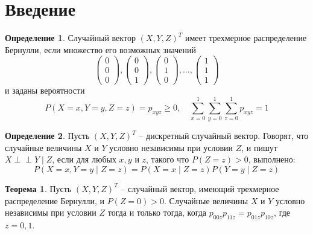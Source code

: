 \documentclass[a4paper,14pt]{extarticle}
\theoremstyle{definition}
\newtheorem{definition}{Определение}[section]
\newtheorem{theorem}{Теорема}[section]
\def\ci{\perp\!\!\!\perp}
\begin{document}
\section{Введение}

\begin{definition}
    Случайный вектор $(X,Y,Z)^T$ имеет трехмерное распределение Бернулли,
    если множество его возможных значений
    $$
        \begin{pmatrix}
            0 \\
            0 \\
            0
        \end{pmatrix},
        \begin{pmatrix}
            0 \\
            0 \\
            1
        \end{pmatrix},
        \begin{pmatrix}
            0 \\
            1 \\
            0
        \end{pmatrix}, \ldots, \begin{pmatrix}
            1 \\
            1 \\
            1
        \end{pmatrix}
    $$ и заданы вероятности
    $$P(X=x,Y=y,Z=z)=p_{xyz} \geq 0, \quad \sum_{x=0}^{1}\sum_{y=0}^{1}\sum_{z=0}^{1}p_{xyz}=1$$
\end{definition}

\begin{definition}
    Пусть $(X,Y,Z)^T$ -- дискретный случайный вектор.
    Говорят, что случайные величины $X$ и $Y$ условно независимы при условии $Z$,
    и пишут $X \ci Y \mid Z$, если
    для любых $x,y$ и $z$, такого что $P(Z=z)>0$, выполнено:
    $$
        P(X=x, Y=y \mid Z = z) = P(X=x \mid Z = z) P(Y=y \mid Z = z)
    $$
\end{definition}

\begin{theorem}\label{thm1}
    Пусть $(X,Y,Z)^T$ -- случайный вектор, имеющий трехмерное распределение Бернулли, и $P(Z=0)>0$.
    Случайные величины $X$ и $Y$ условно независимы при условии $Z$ тогда и только тогда, когда
    $p_{00z}p_{11z}=p_{01z}p_{10z}$, где $z=0,1$.
\end{theorem}
\end{document}
